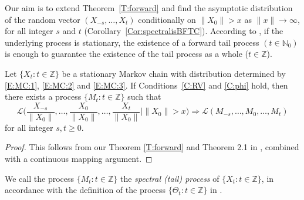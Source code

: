 \documentclass{aptpubarxiv}
\numberwithin{equation}{section}
\begin{document}
Our aim is to extend Theorem~\ref{T:forward} and find the asymptotic distribution of the random vector $(X_{-s}, \ldots, X_t)$ conditionally on $\|X_0\| > x$ as $\| x \| \to \infty$, for all integer $s$ and $t$ (Corollary~\ref{Cor:spectralisBFTC}). 
According to \citet[][Theorem~2.1]{BS09}, if the underlying process is stationary, the existence of a forward tail process $(t \in {\mathbb{N}}_0)$ is enough to guarantee the existence of the tail process as a whole ($t \in \mathbb{Z}$).

\begin{prop}
\label{P:BS09:2.1}
Let $\{ X_t : t \in {\mathbb{Z}}\}$ be a stationary Markov chain with distribution determined by \eqref{E:MC:1}, \eqref{E:MC:2} and \eqref{E:MC:3}. If Conditions~\ref{C:RV} and \ref{C:phi} hold, then there exists a process $\{M_t: t \in \mathbb{Z}\}$ such that
\begin{equation}
\label{E:forwardandbackward:existence}
	{\mathcal{L}} \biggl(\frac{X_{-s}}{\|X_0\|}, \dots, \frac{X_0}{\|X_0\|}, \ldots, \frac{X_t}{\|X_0\|} \bigg| \|X_0\| > x \biggr)
	\Rightarrow {\mathcal{L}}(M_{-s}, \ldots, M_0, \ldots, M_t)
\end{equation}
for all integer $s,t \geq 0$.
\end{prop}

\begin{proof}
This follows from our Theorem \ref{T:forward} and Theorem 2.1 in \citet{BS09}, combined with a continuous mapping argument.
\end{proof}

We call the process $\{M_t: t \in \mathbb{Z}\}$ the \emph{spectral (tail) process} of $\{X_t: t \in \mathbb{Z}\}$, in accordance with the definition of the process $\{\Theta_t: t \in \mathbb{Z}\}$ in \citet{BS09}. 
\end{document}
